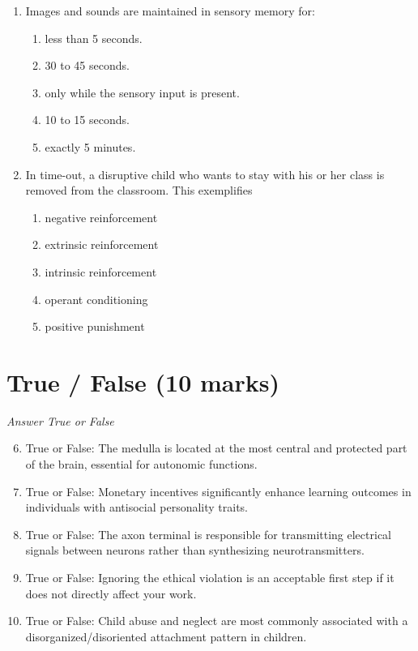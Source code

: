 \documentclass[12pt]{article}
\begin{document}
\begin{enumerate}[label=\arabic*.]
\begin{enumerate}[label=(\alph*)]
    \item Self-determination theory
    \item Intrinsic motivation
    \item Maslow's pyramid of desire
\end{enumerate}
\item Images and sounds are maintained in sensory memory for:
\begin{enumerate}[label=(\alph*)]
    \item less than 5 seconds.
    \item 30 to 45 seconds.
    \item only while the sensory input is present.
    \item 10 to 15 seconds.
    \item exactly 5 minutes.
\end{enumerate}
\item In time-out, a disruptive child who wants to stay with his or her class is removed from
the classroom. This exemplifies
\begin{enumerate}[label=(\alph*)]
    \item negative reinforcement
    \item extrinsic reinforcement
    \item intrinsic reinforcement
    \item operant conditioning
    \item positive punishment
\end{enumerate}
\end{enumerate}

\section*{True / False (10 marks)}
\textit{Answer True or False}
\begin{enumerate}[label=\arabic*.]
\setcounter{enumi}{5}
\item True or False: The medulla is located at the most central and protected part of the brain, essential for autonomic functions.
\item True or False: Monetary incentives significantly enhance learning outcomes in individuals with antisocial personality traits.
\item True or False: The axon terminal is responsible for transmitting electrical signals between neurons rather than synthesizing neurotransmitters.
\item True or False: Ignoring the ethical violation is an acceptable first step if it does not directly affect your work.
\item True or False: Child abuse and neglect are most commonly associated with a disorganized/disoriented attachment pattern in children.
\end{enumerate}
\end{document}
